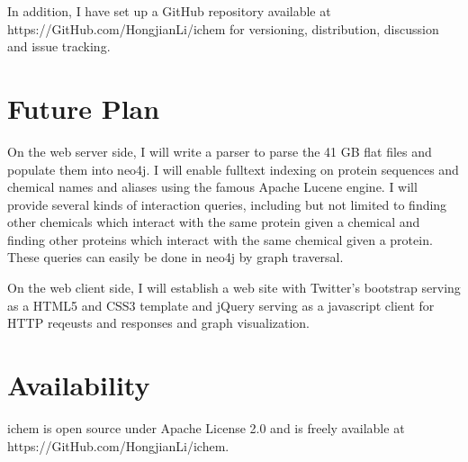 \documentclass[10pt,conference,compsocconf]{../IEEEtran}
\begin{document}
In addition, I have set up a GitHub repository available at https://GitHub.com/HongjianLi/ichem for versioning, distribution, discussion and issue tracking.

\section{Future Plan}

On the web server side, I will write a parser to parse the 41 GB flat files and populate them into neo4j. I will enable fulltext indexing on protein sequences and chemical names and aliases using the famous Apache Lucene engine. I will provide several kinds of interaction queries, including but not limited to finding other chemicals which interact with the same protein given a chemical and finding other proteins which interact with the same chemical given a protein. These queries can easily be done in neo4j by graph traversal.

On the web client side, I will establish a web site with Twitter's bootstrap serving as a HTML5 and CSS3 template and jQuery serving as a javascript client for HTTP reqeusts and responses and graph visualization.

\section{Availability}

ichem is open source under Apache License 2.0 and is freely available at https://GitHub.com/HongjianLi/ichem.






\end{document}
